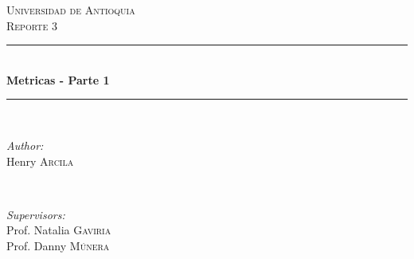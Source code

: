 \documentclass[12pt]{article}
\begin{document}
\begin{titlepage}

\newcommand{\HRule}{\rule{\linewidth}{0.5mm}} %

\center %
 

\textsc{\LARGE Universidad de Antioquia}\\[1.5cm] %
\textsc{\Large Reporte 3}\\[0.5cm] %


\HRule \\[0.4cm]
{ \huge \bfseries Metricas - Parte 1}\\[0.4cm] %
\HRule \\[1.5cm]
 

\begin{minipage}{0.4\textwidth}
\begin{flushleft} \large
\emph{Author:}\\
Henry \textsc{Arcila} %
\end{flushleft}
\end{minipage}
~
\begin{minipage}{0.4\textwidth}
\begin{flushright} \large
\emph{Supervisors:} \\
Prof. Natalia \textsc{Gaviria} \\%
Prof. Danny \textsc{Múnera} %

\end{flushright}
\end{minipage}\\[2cm]


\end{titlepage}
\end{document}
